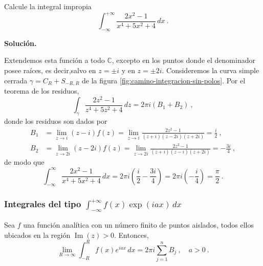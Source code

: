 \begin{ejemplo}
    Calcule la integral impropia
    \begin{equation*}
        \int_{-\infty}^{+\infty} \frac{2x^2-1}{x^4+5x^2+4} \, dx \ .
    \end{equation*}

    \noindent \textbf{Solución.}

    Extendemos esta función a todo $\mathbb{C}$, excepto en los puntos donde el denominador posee raíces, es decir,salvo en $z = \pm i$ y en $z = \pm 2i$. Consideremos la curva simple cerrada $\gamma = C_R + S_{-R, R}$ de la figura \ref{fig:camino-integracion-sin-polos}. Por el teorema de los residuos,
    \begin{equation*}
        \int_\gamma \frac{2z^2-1}{z^4+5z^2+4} \, dz = 2\pi i (B_1 + B_2) \ , 
    \end{equation*}
    donde los residuos son dados por
    \begin{align*}
        B_1 & = \lim_{z \to i} (z-i)f(z) = \lim_{z \to i} \frac{2z^2-1}{(z+i)(z-2i)(z+2i)} = \frac{i}{2} \ , \\
        B_2 & = \lim_{z \to 2i} (z-2i)f(z) = \lim_{z \to 2i} \frac{2z^2-1}{(z+i)(z-i)(z+2i)} = -\frac{3i}{4} \ ,
    \end{align*}
    de modo que
    \begin{equation*}
        \int_{-\infty}^\infty \frac{2x^2-1}{x^4+5x^2+4} \, dx = 2\pi i\left( \frac{i}{2} - \frac{3i}{4} \right) = 2\pi i \left( -\frac{i}{4} \right) = \frac{\pi}{2} \ .
    \end{equation*}
\end{ejemplo}



\subsubsection{Integrales del tipo $\displaystyle \int_{-\infty}^{+\infty} f(x)\exp(iax) \, dx$}

\begin{teorema}
    Sea $f$ una función analítica con un número finito de puntos aislados, todos ellos ubicados en la región $\operatorname{Im}(z) > 0$. Entonces,
    \begin{equation}
        \lim_{R \to \infty} \int_{-R}^R f(x) e^{iax} \, dx = 2\pi i \sum_{j=1}^n B_j \ , \quad a > 0 \ .
    \end{equation}
\end{teorema}


